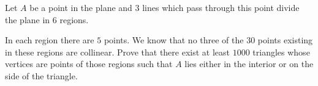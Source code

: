 Let $A$ be a point in the plane and $3$ lines which pass through this point divide the plane in $6$ regions.

In each region there are $5$ points. We know that no three of the $30$ points existing in these regions are collinear. Prove that there exist at least $1000$ triangles whose vertices are points of those regions such that $A$ lies either in the interior or on the side of the triangle.